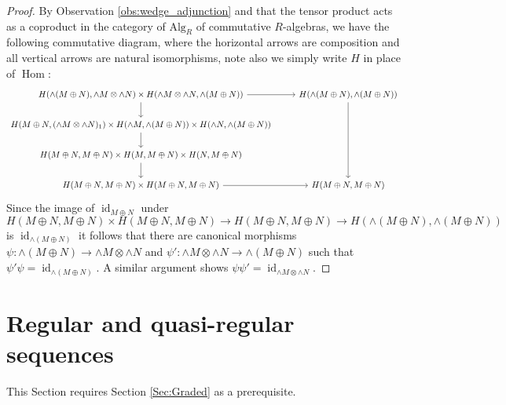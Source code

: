 \documentclass[12pt]{article}
\theoremstyle{plain}
\theoremstyle{definition}
\newcommand{\lto}{\longrightarrow}
\begin{document}
\begin{proof}
By Observation \ref{obs:wedge_adjunction} and that the tensor product acts as a coproduct in the category of $\text{Alg}_R$ of commutative $R$-algebras, we have the following commutative diagram, where the horizontal arrows are composition and all vertical arrows are natural isomorphisms, note also we simply write $H$ in place of $\operatorname{Hom}$:
\begin{equation}
\begin{tikzcd}
H(\wedge(M \oplus N), \wedge M \otimes \wedge N) \times H(\wedge M \otimes \wedge N, \wedge(M \oplus N))\arrow[r]\arrow[d] & H(\wedge(M \oplus N), \wedge(M \oplus N))\arrow[ddd]\\
H(M \oplus N, (\wedge M \otimes \wedge N)_1) \times H(\wedge M, \wedge(M \oplus N)) \times H(\wedge N, \wedge(M \oplus N))\arrow[d]\\
H(M \oplus N, M \oplus N) \times H(M, M\oplus N) \times H(N, M \oplus N)\arrow[d]\\
H(M \oplus N, M \oplus N) \times H(M \oplus N, M \oplus N)\arrow[r] & H(M \oplus N, M \oplus N)
\end{tikzcd}
\end{equation}
Since the image of $\operatorname{id}_{M \oplus N}$ under
\begin{equation}
H(M \oplus N, M \oplus N) \times H(M \oplus N, M \oplus N)\lto H(M \oplus N, M \oplus N) \lto H(\wedge(M \oplus N), \wedge(M \oplus N))
\end{equation}
is $\operatorname{id}_{\wedge(M \oplus N)}$ it follows that there are canonical morphisms $\psi: \wedge(M \oplus N) \lto \wedge M \otimes \wedge N$ and $\psi': \wedge M \otimes \wedge N \lto \wedge (M \oplus N)$ such that $\psi' \psi = \operatorname{id}_{\wedge(M \oplus N)}$. A similar argument shows $\psi \psi' = \operatorname{id}_{\wedge M \otimes \wedge N}$.
\end{proof}
\section{Regular and quasi-regular sequences}
This Section requires Section \ref{Sec:Graded} as a prerequisite.
\end{document}
